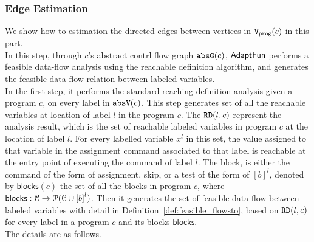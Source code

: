\subsubsection{Edge Estimation}
\label{sec:alg_edgegen}
We show how to estimation the directed edges between vertices in $\mathtt{{V_{prog}}}(c)$ in this part.
\\
In this step, through 
$c$'s abstract contrl flow graph $\mathtt{abs}{\mathtt{G}}(c)$,
 $\textsf{AdaptFun}$ performs a feasible data-flow analysis 
 using the reachable definition algorithm,
and generates the 
feasible data-flow relation between labeled variables.
\\
In the first step, 
it performs the standard reaching definition analysis given a program $c$, 
on 
every label in $\mathtt{abs}{\mathtt{V}}(c)$.  This step generates set of all the reachable variables at location of label $l$ in the program $c$.
The $\mathtt{RD}(l, c)$ represent the analysis result, which is the set of 
reachable labeled variables in program $c$ at the location of label $l$.
For every labelled variable $x^l$ in this set, 
the value assigned to that variable
in the assignment command associated to that label is reachable at the entry point of  executing the command of label $l$.
The block, 
is either the command of the form of assignment, skip, or a test of the form of $[b]^{l}$, 
denoted by $\mathsf{blocks}(c)$
the set of all the blocks 
in program $c$, where  $\mathsf{blocks}: \cdom \to \mathcal{P}(\cdom \cup \clabel{\bexpr}^{l})$.
Then it generates the set of feasible data-flow between labeled variables with detail in Definition~\ref{def:feasible_flowsto}, 
based on $\mathtt{RD}(l, c)$ for every label in a program $c$ and its blocks $\mathsf{blocks}$.
\\
The details are as follows.
%
